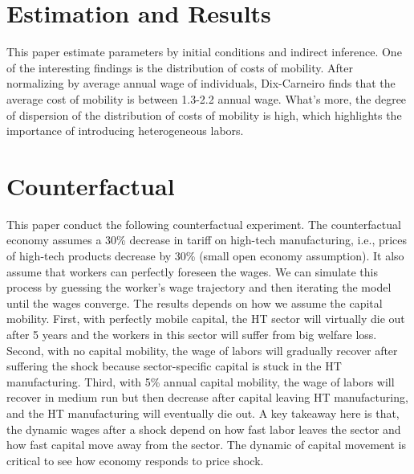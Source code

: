 \documentclass{article}
\begin{document}
\section{Estimation and Results}
This paper estimate parameters by initial conditions and indirect inference. One of the interesting findings is the distribution of costs of mobility. After normalizing by average annual wage of individuals, Dix-Carneiro finds that the average cost of mobility is between 1.3-2.2 annual wage. What's more, the degree of dispersion of the distribution of costs of mobility is high, which highlights the importance of introducing heterogeneous labors.
\section{Counterfactual}
This paper conduct the following counterfactual experiment. The counterfactual economy assumes a 30\% decrease in tariff on high-tech manufacturing, i.e., prices of high-tech products decrease by 30\% (small open economy assumption). It also assume that workers can perfectly foreseen the wages. We can simulate this process by guessing the worker's wage trajectory and then iterating the model until the wages converge. The results depends on how we assume the capital mobility. First, with perfectly mobile capital, the HT sector will virtually die out after 5 years and the workers in this sector will suffer from big welfare loss. Second, with no capital mobility, the wage of labors will gradually recover after suffering the shock because sector-specific capital is stuck in the HT manufacturing. Third, with 5\% annual capital mobility,  the wage of labors will recover in medium run but then decrease after capital leaving HT manufacturing, and the HT manufacturing will eventually die out. A key takeaway here is that, the dynamic wages after a shock depend on how fast labor leaves the sector and how fast capital move away from the sector. The dynamic of capital movement is critical to see how economy responds to price shock.
\end{document}
